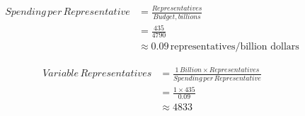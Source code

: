 \documentclass[fleqn]{article}
\begin{document}
	
	\Large
	
	\begin{equation*}
	\begin{split}
		Spending \, per \, Representative &= \frac{Representatives}{Budget, billions} \\
		&= \frac{435}{4790} \\
		&\approx{0.09} \, \text{representatives/billion dollars}
	\end{split}
	\end{equation*}

	\begin{equation*}
	\begin{split}
		Variable \, Representatives &= \frac{1 \, Billion \times Representatives}{Spending \, per \, Representative} \\
		&= \frac{1 \times 435}{0.09} \\
		&\approx{4833}
	\end{split}
	\end{equation*}
	
\end{document}
